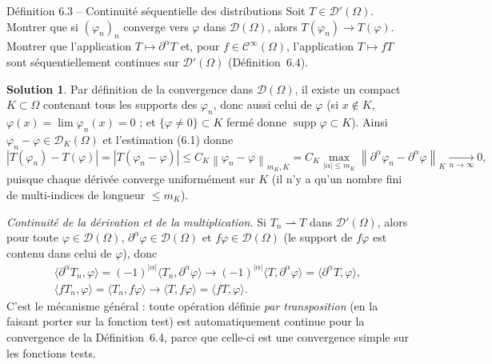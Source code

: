 \documentclass[11pt,a4paper]{article}
\newcommand{\norm}[1]{\left\|#1\right\|}
\newcommand{\Cinf}{\mathcal{C}^\infty}
\DeclareMathOperator{\supp}{supp}
\newcommand{\D}{\mathcal{D}}
\theoremstyle{definition}
\newtheorem*{solution}{Solution}
\begin{document}
\begin{exo}{Définition 6.3 -- Continuité séquentielle des distributions}
Soit $T\in\D'(\Omega)$. Montrer que si $(\varphi_n)_n$ converge vers $\varphi$ dans $\D(\Omega)$, alors $T(\varphi_n)\to T(\varphi)$. Montrer que l'application $T\mapsto\partial^\alpha T$ et, pour $f\in\Cinf(\Omega)$, l'application $T\mapsto fT$ sont séquentiellement continues sur $\D'(\Omega)$ (Définition~6.4).
\end{exo}

\begin{solution}
Par définition de la convergence dans $\D(\Omega)$, il existe un compact $K\subset\Omega$ contenant tous les supports des $\varphi_n$, donc aussi celui de $\varphi$ (si $x\notin K$, $\varphi(x)=\lim\varphi_n(x)=0$ ; et $\{\varphi\neq0\}\subset K$ fermé donne $\supp\varphi\subset K$). Ainsi $\varphi_n-\varphi\in\D_K(\Omega)$ et l'estimation (6.1) donne
\[
|T(\varphi_n)-T(\varphi)|=|T(\varphi_n-\varphi)|\le C_K\norm{\varphi_n-\varphi}_{m_K,K}=C_K\max_{|\alpha|\le m_K}\norm{\partial^\alpha\varphi_n-\partial^\alpha\varphi}_K\xrightarrow[n\to\infty]{}0,
\]
puisque chaque dérivée converge uniformément sur $K$ (il n'y a qu'un nombre fini de multi-indices de longueur $\le m_K$).

\emph{Continuité de la dérivation et de la multiplication.} Si $T_n\rightharpoonup T$ dans $\D'(\Omega)$, alors pour toute $\varphi\in\D(\Omega)$, $\partial^\alpha\varphi\in\D(\Omega)$ et $f\varphi\in\D(\Omega)$ (le support de $f\varphi$ est contenu dans celui de $\varphi$), donc
\begin{gather*}
\langle\partial^\alpha T_n,\varphi\rangle=(-1)^{|\alpha|}\langle T_n,\partial^\alpha\varphi\rangle\to(-1)^{|\alpha|}\langle T,\partial^\alpha\varphi\rangle=\langle\partial^\alpha T,\varphi\rangle,\\
\langle fT_n,\varphi\rangle=\langle T_n,f\varphi\rangle\to\langle T,f\varphi\rangle=\langle fT,\varphi\rangle .
\end{gather*}
C'est le mécanisme général : toute opération définie \emph{par transposition} (en la faisant porter sur la fonction test) est automatiquement continue pour la convergence de la Définition~6.4, parce que celle-ci est une convergence simple sur les fonctions tests.
\end{solution}
\end{document}
